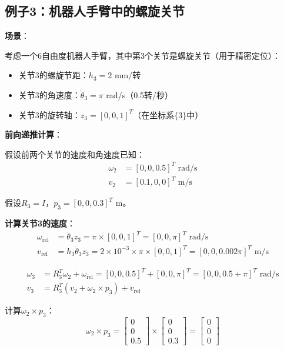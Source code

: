 \documentclass[12pt,a4paper]{article}
\begin{document}
\subsection{例子3：机器人手臂中的螺旋关节}

\textbf{场景}：

考虑一个6自由度机器人手臂，其中第3个关节是螺旋关节（用于精密定位）：
\begin{itemize}
\item 关节3的螺旋节距：$h_3 = 2$ mm/转
\item 关节3的角速度：$\dot{\theta}_3 = \pi$ rad/s（0.5转/秒）
\item 关节3的旋转轴：$z_3 = [0, 0, 1]^T$（在坐标系$\{3\}$中）
\end{itemize}

\textbf{前向递推计算}：

假设前两个关节的速度和角速度已知：
\begin{align}
\omega_2 &= [0, 0, 0.5]^T \text{ rad/s} \\
v_2 &= [0.1, 0, 0]^T \text{ m/s}
\end{align}

假设$R_3 = I$，$p_3 = [0, 0, 0.3]^T$ m。

\textbf{计算关节3的速度}：
\begin{align}
\omega_{\text{rel}} &= \dot{\theta}_3 z_3 = \pi \times [0, 0, 1]^T = [0, 0, \pi]^T \text{ rad/s} \\
v_{\text{rel}} &= h_3 \dot{\theta}_3 z_3 = 2 \times 10^{-3} \times \pi \times [0, 0, 1]^T = [0, 0, 0.002\pi]^T \text{ m/s}
\end{align}

\begin{align}
\omega_3 &= R_3^T \omega_2 + \omega_{\text{rel}} = [0, 0, 0.5]^T + [0, 0, \pi]^T = [0, 0, 0.5 + \pi]^T \text{ rad/s} \\
v_3 &= R_3^T (v_2 + \omega_2 \times p_3) + v_{\text{rel}}
\end{align}

计算$\omega_2 \times p_3$：
\begin{equation}
\omega_2 \times p_3 = \begin{bmatrix}
0 \\ 0 \\ 0.5
\end{bmatrix} \times \begin{bmatrix}
0 \\ 0 \\ 0.3
\end{bmatrix} = \begin{bmatrix}
0 \\ 0 \\ 0
\end{bmatrix}
\end{equation}
\end{document}
